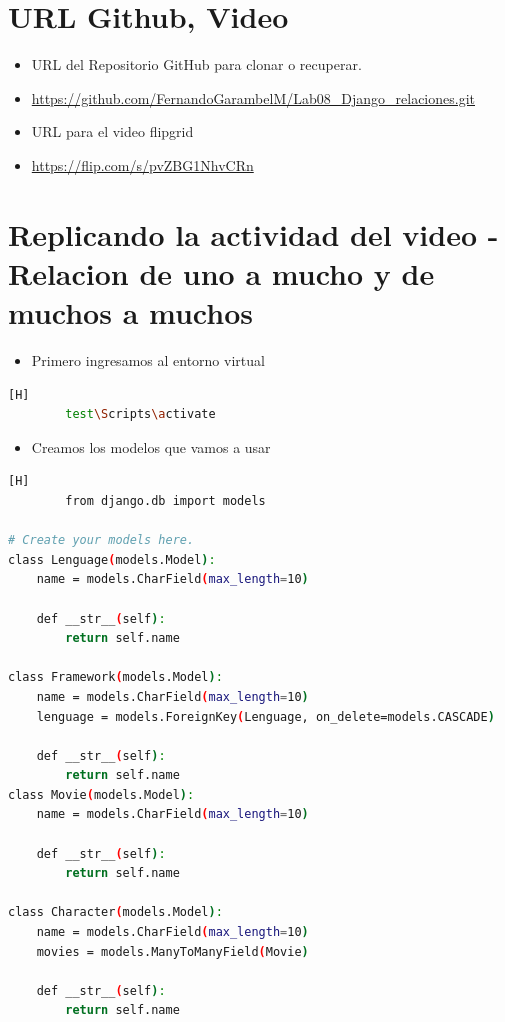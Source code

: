 \documentclass{article}
\begin{document}
\section{URL Github, Video}
	\begin{itemize}
		\item URL del Repositorio GitHub para clonar o recuperar.
		\item \url{https://github.com/FernandoGarambelM/Lab08_Django_relaciones.git}
		\item URL para el video flipgrid
		\item \url{https://flip.com/s/pvZBG1NhvCRn}	
	\end{itemize}
	\clearpage
\section{Replicando la actividad del video - Relacion de uno a mucho y de muchos a muchos}
	\begin{itemize}
		\item Primero ingresamos al entorno virtual
	\end{itemize}
	\begin{lstlisting}[language=bash,caption={Activar el ambiente virtual}][H]
		test\Scripts\activate
	\end{lstlisting}
	\begin{itemize}
		\item Creamos los modelos que vamos a usar
	\end{itemize}
	\begin{lstlisting}[language=bash,caption={Codigo de models.py}][H]
		from django.db import models

# Create your models here.
class Lenguage(models.Model):
    name = models.CharField(max_length=10)
    
    def __str__(self):
        return self.name
    
class Framework(models.Model):
    name = models.CharField(max_length=10)
    lenguage = models.ForeignKey(Lenguage, on_delete=models.CASCADE)

    def __str__(self):
        return self.name
class Movie(models.Model):
    name = models.CharField(max_length=10)

    def __str__(self):
        return self.name
    
class Character(models.Model):
    name = models.CharField(max_length=10)
    movies = models.ManyToManyField(Movie)

    def __str__(self):
        return self.name
	\end{lstlisting}
\end{document}
